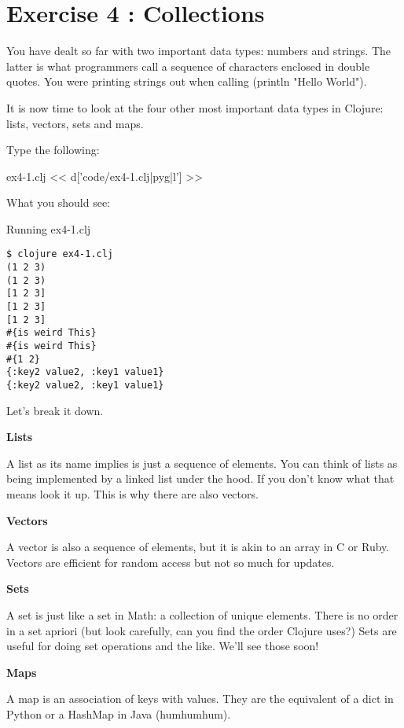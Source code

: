 \chapter{Exercise 4 : Collections}

You have dealt so far with two important data types: numbers and strings. The latter is what programmers call a sequence of characters enclosed in double quotes. You were printing strings out when calling (println "Hello World").

It is now time to look at the four other most important data types in Clojure:
lists, vectors, sets and maps.

Type the following:
\begin{code}{ex4-1.clj}
<< d['code/ex4-1.clj|pyg|l'] >>
\end{code} 

What you should see:

\begin{code}{Running ex4-1.clj}
\begin{Verbatim}
$ clojure ex4-1.clj 
(1 2 3)
(1 2 3)
[1 2 3]
[1 2 3]
[1 2 3]
#{is weird This}
#{is weird This}
#{1 2}
{:key2 value2, :key1 value1}
{:key2 value2, :key1 value1}
\end{Verbatim}
\end{code}

Let's break it down.

{\bf Lists}

A list as its name implies is just a sequence of elements. You can think of lists as being implemented by a linked list under the hood. If you don't know what that means look it up. This is why there are also vectors.

{\bf Vectors}

A vector is also a sequence of elements, but it is akin to an array in C or Ruby. 
Vectors are efficient for random access but not so much for updates.

{\bf Sets}

A set is just like a set in Math: a collection of unique elements. There is no order in a set apriori (but look carefully, can you find the order Clojure uses?) 
Sets are useful for doing set operations and the like. We'll see those soon!

{\bf Maps}

A map is an association of keys with values. They are the equivalent of a dict in Python or a HashMap in Java (humhumhum).




